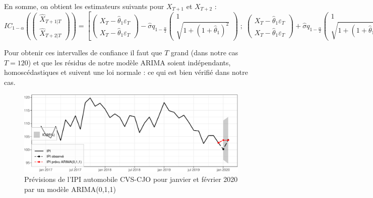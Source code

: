 \documentclass[,french]{article}
\begin{document}
En somme, on obtient les estimateurs suivants pour \(X_{T+1}\) et \(X_{T+2}\) :
\begin{equation}
IC_{1-\alpha}\left(\begin{pmatrix} \hat X_{T+1\vert T}
\\ \hat X_{T+2\vert T}\end{pmatrix}\right) =
\left[
  \begin{pmatrix} 
    X_T - \hat\theta_1\varepsilon_T 
    \\ X_T - \hat\theta_1\varepsilon_T 
  \end{pmatrix}
  -
  \hat\sigma q_{1-\frac \alpha 2}
  \begin{pmatrix} 
    1\\
    \sqrt{1+(1+\hat \theta_1)^2}
  \end{pmatrix}
  \;;\;
  \begin{pmatrix} 
    X_T - \hat\theta_1\varepsilon_T 
    \\ X_T - \hat\theta_1\varepsilon_T 
  \end{pmatrix}
  +
  \hat\sigma q_{1-\frac \alpha 2}
  \begin{pmatrix} 
    1\\
    \sqrt{1+(1+\hat \theta_1)^2}
  \end{pmatrix}
\right]
\label{eq:icPrev}
\end{equation}

Pour obtenir ces intervalles de confiance il faut que \(T\) grand (dans notre cas \(T=120\)) et que les résidus de notre modèle ARIMA soient indépendants, homoscédastiques et suivent une loi normale : ce qui est bien vérifié dans notre cas.

\begin{figure}

{\centering \includegraphics{img/rmd-prevIpi-1} 

}

\caption{Prévisions de l'IPI automobile CVS-CJO pour janvier et février 2020 par un modèle ARIMA(0,1,1)}\label{fig:prevIpi}
\end{figure}
\end{document}
